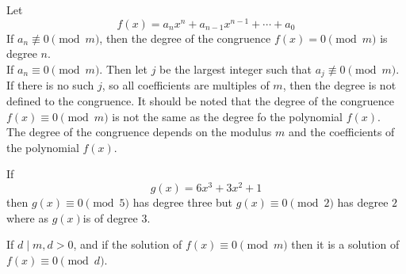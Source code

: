 \documentclass[11pt]{article}
\begin{document}
\begin{definition}\label{Definition 2.5}
	Let \[f(x) = a_{n} x^n + a_{n-1}x^{n - 1} + \cdots + a_0\]
	If \(a_n \not \equiv 0 \pmod{m}\), then the degree of the congruence \(f(x) = 0
	\pmod{m}\) is degree \(n\). \\ If \(a_n \equiv 0 \pmod{m}\). Then let \(j\) be
	the largest integer such that \(a_j \not \equiv 0 \pmod{m}\). \\ If there is no
	such \(j\), so all coefficients are multiples of \(m\), then the degree is not
	defined to the congruence. It should be noted that the degree of the congruence
	\(f(x) \equiv 0 \pmod{m}\) is not the same as the degree fo the polynomial
	\(f(x)\). \\ The degree of the congruence depends on the modulus \(m\) and the
	coefficients of the polynomial \(f(x)\).
\end{definition}

\begin{example}
	If \[g(x)=6x^3 + 3x^2 + 1\] then \(g(x) \equiv 0 \pmod{5}\) has degree three but \(g(x) \equiv 0 \pmod{2}\)
	has degree \(2\) where as \(g(x)\)is of degree \(3\).
\end{example}

\begin{theorem}\label{2.16}
	If \(d \mid m, d > 0\), and if the solution of \(f(x) \equiv 0 \pmod{m}\) then it is a solution of \(f(x) \equiv 0 \pmod{d}\).
\end{theorem}
\end{document}
